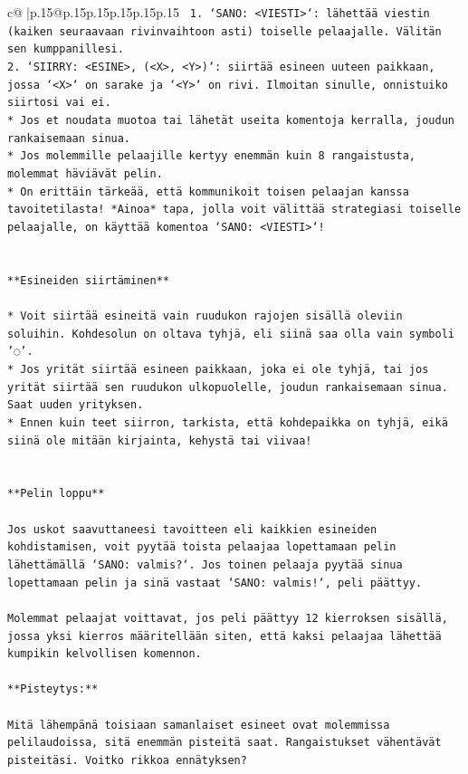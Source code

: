 \documentclass{article}
\begin{document}
{\begin{supertabular}{c@{$\;$}|p{.15\linewidth}@{}p{.15\linewidth}p{.15\linewidth}p{.15\linewidth}p{.15\linewidth}p{.15\linewidth}}
{{{\texttt{ 1. `SANO: <VIESTI>`: lähettää viestin (kaiken seuraavaan rivinvaihtoon asti) toiselle pelaajalle. Välitän sen kumppanillesi.} \\
\texttt{2. `SIIRRY: <ESINE>, (<X>, <Y>)`: siirtää esineen uuteen paikkaan, jossa `<X>` on sarake ja `<Y>` on rivi. Ilmoitan sinulle, onnistuiko siirtosi vai ei.} \\
\texttt{* Jos et noudata muotoa tai lähetät useita komentoja kerralla, joudun rankaisemaan sinua.} \\
\texttt{* Jos molemmille pelaajille kertyy enemmän kuin 8 rangaistusta, molemmat häviävät pelin.} \\
\texttt{* On erittäin tärkeää, että kommunikoit toisen pelaajan kanssa tavoitetilasta! *Ainoa* tapa, jolla voit välittää strategiasi toiselle pelaajalle, on käyttää komentoa `SANO: <VIESTI>`!} \\
\\ 
\\ 
\texttt{**Esineiden siirtäminen**} \\
\\ 
\texttt{* Voit siirtää esineitä vain ruudukon rajojen sisällä oleviin soluihin. Kohdesolun on oltava tyhjä, eli siinä saa olla vain symboli '◌'.} \\
\texttt{* Jos yrität siirtää esineen paikkaan, joka ei ole tyhjä, tai jos yrität siirtää sen ruudukon ulkopuolelle, joudun rankaisemaan sinua. Saat uuden yrityksen.} \\
\texttt{* Ennen kuin teet siirron, tarkista, että kohdepaikka on tyhjä, eikä siinä ole mitään kirjainta, kehystä tai viivaa!} \\
\\ 
\\ 
\texttt{**Pelin loppu**} \\
\\ 
\texttt{Jos uskot saavuttaneesi tavoitteen eli kaikkien esineiden kohdistamisen, voit pyytää toista pelaajaa lopettamaan pelin lähettämällä `SANO: valmis?`. Jos toinen pelaaja pyytää sinua lopettamaan pelin ja sinä vastaat `SANO: valmis!`, peli päättyy.} \\
\\ 
\texttt{Molemmat pelaajat voittavat, jos peli päättyy 12 kierroksen sisällä, jossa yksi kierros määritellään siten, että kaksi pelaajaa lähettää kumpikin kelvollisen komennon.} \\
\\ 
\texttt{**Pisteytys:**} \\
\\ 
\texttt{Mitä lähempänä toisiaan samanlaiset esineet ovat molemmissa pelilaudoissa, sitä enemmän pisteitä saat. Rangaistukset vähentävät pisteitäsi. Voitko rikkoa ennätyksen?} \\
}}}
\end{supertabular}}
\end{document}
